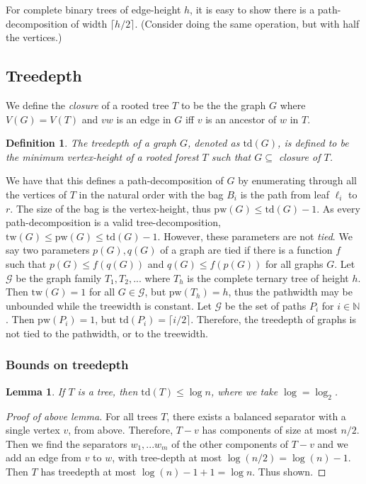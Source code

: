 \documentclass[]{article}
\newcommand{\tw}{\text{tw}}
\newcommand{\pw}{\text{pw}}
\newcommand{\td}{\text{td}}
\newtheorem{lemma}[theorem]{Lemma}
\newtheorem{definition}[theorem]{Definition}
\theoremstyle{definition}
\numberwithin{theorem}{section}
\numberwithin{equation}{section}
\begin{document}
For complete binary trees of edge-height $h$, it is easy to show there is a path-decomposition of width $\lceil h/2 \rceil$. (Consider doing the same operation, but with half the vertices.)

\subsection{Treedepth}
We define the \textit{closure} of a rooted tree $T$ to be the the graph $G$ where $V(G) = V(T)$ and $vw$ is an edge in $G$ iff $v$ is an ancestor of $w$ in $T$.
\begin{definition}
	The treedepth of a graph $G$, denoted as $\td(G)$, is defined to be the minimum vertex-height of a rooted forest $T$ such that $G \subseteq $ closure of $T$.
\end{definition}
We have that this defines a path-decomposition of $G$ by enumerating through all the vertices of $T$ in the natural order with the bag $B_i$ is the path from leaf $\ell_i$ to $r$. The size of the bag is the vertex-height, thus $\pw(G) \leq \td(G) - 1$. As every path-decomposition is a valid tree-decomposition, $\tw(G) \leq \pw(G) \leq \td(G) - 1$. However, these parameters are not \textit{tied}. We say two parameters $p(G), q(G)$ of a graph are tied if there is a function $f$ such that $ p(G) \leq f(q(G))$ and $q(G) \leq f(p(G))$ for all graphs $G$. 
Let $\mathcal{G}$ be the graph family $T_1, T_2, ...$ where $T_h$ is the complete ternary tree of height $h$. Then $\tw(G) = 1$ for all $G \in \mathcal{G}$, but $\pw(T_h) = h$, thus the pathwidth may be unbounded while the treewidth is constant. Let $\mathcal{G}$ be the set of paths $P_i$ for $i \in \mathbb{N}$. Then $\pw(P_i) =  1$, but $\td(P_i) = \lceil i/2 \rceil$. Therefore, the treedepth of graphs is not tied to the pathwidth, or to the treewidth.
\subsubsection{Bounds on treedepth}
\begin{lemma}
	If $T$ is a tree, then $\td(T) \leq \log n$, where we take $\log = \log_2$. 
\end{lemma}
\begin{proof}[Proof of above lemma]
	For all trees $T$, there exists a balanced separator with a single vertex $v$, from above. Therefore, $T-v$ has components of size at most $n/2$. Then we find the separators $w_1,... w_m$ of the other components of $T - v$ and we add an edge from $v$ to $w$, with tree-depth at most $\log(n/2) = \log(n) - 1$. Then $T$ has treedepth at most $\log(n) - 1 + 1 = \log n$. Thus shown. 
\end{proof}
\end{document}
